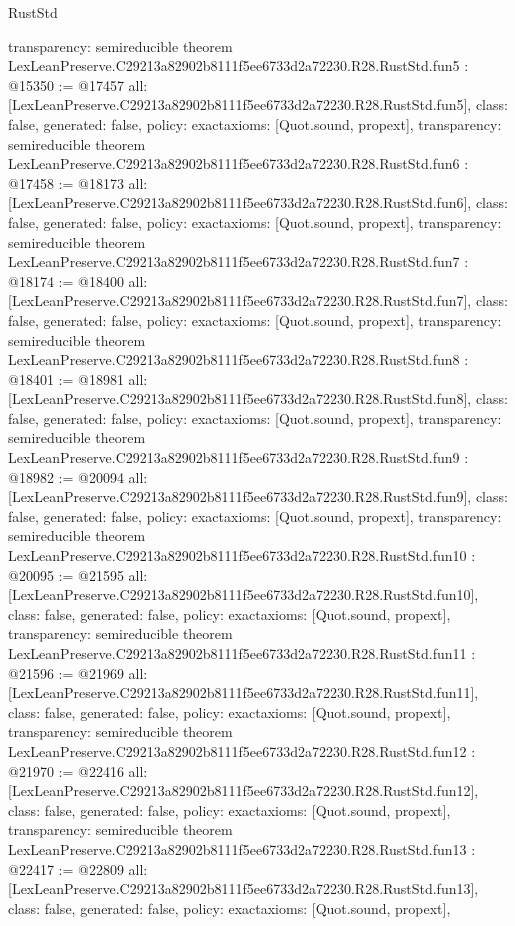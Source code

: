 \begin{lexlean}{RustStd}
\begin{coremodule}
{  transparency: semireducible
}
theorem LexLeanPreserve.C29213a82902b8111f5ee6733d2a72230.R28.RustStd.fun5 : @15350 := @17457 {
  all: [LexLeanPreserve.C29213a82902b8111f5ee6733d2a72230.R28.RustStd.fun5],
  class: false,
  generated: false,
  policy: exact{axioms: [Quot.sound, propext]},
  transparency: semireducible
}
theorem LexLeanPreserve.C29213a82902b8111f5ee6733d2a72230.R28.RustStd.fun6 : @17458 := @18173 {
  all: [LexLeanPreserve.C29213a82902b8111f5ee6733d2a72230.R28.RustStd.fun6],
  class: false,
  generated: false,
  policy: exact{axioms: [Quot.sound, propext]},
  transparency: semireducible
}
theorem LexLeanPreserve.C29213a82902b8111f5ee6733d2a72230.R28.RustStd.fun7 : @18174 := @18400 {
  all: [LexLeanPreserve.C29213a82902b8111f5ee6733d2a72230.R28.RustStd.fun7],
  class: false,
  generated: false,
  policy: exact{axioms: [Quot.sound, propext]},
  transparency: semireducible
}
theorem LexLeanPreserve.C29213a82902b8111f5ee6733d2a72230.R28.RustStd.fun8 : @18401 := @18981 {
  all: [LexLeanPreserve.C29213a82902b8111f5ee6733d2a72230.R28.RustStd.fun8],
  class: false,
  generated: false,
  policy: exact{axioms: [Quot.sound, propext]},
  transparency: semireducible
}
theorem LexLeanPreserve.C29213a82902b8111f5ee6733d2a72230.R28.RustStd.fun9 : @18982 := @20094 {
  all: [LexLeanPreserve.C29213a82902b8111f5ee6733d2a72230.R28.RustStd.fun9],
  class: false,
  generated: false,
  policy: exact{axioms: [Quot.sound, propext]},
  transparency: semireducible
}
theorem LexLeanPreserve.C29213a82902b8111f5ee6733d2a72230.R28.RustStd.fun10 : @20095 := @21595 {
  all: [LexLeanPreserve.C29213a82902b8111f5ee6733d2a72230.R28.RustStd.fun10],
  class: false,
  generated: false,
  policy: exact{axioms: [Quot.sound, propext]},
  transparency: semireducible
}
theorem LexLeanPreserve.C29213a82902b8111f5ee6733d2a72230.R28.RustStd.fun11 : @21596 := @21969 {
  all: [LexLeanPreserve.C29213a82902b8111f5ee6733d2a72230.R28.RustStd.fun11],
  class: false,
  generated: false,
  policy: exact{axioms: [Quot.sound, propext]},
  transparency: semireducible
}
theorem LexLeanPreserve.C29213a82902b8111f5ee6733d2a72230.R28.RustStd.fun12 : @21970 := @22416 {
  all: [LexLeanPreserve.C29213a82902b8111f5ee6733d2a72230.R28.RustStd.fun12],
  class: false,
  generated: false,
  policy: exact{axioms: [Quot.sound, propext]},
  transparency: semireducible
}
theorem LexLeanPreserve.C29213a82902b8111f5ee6733d2a72230.R28.RustStd.fun13 : @22417 := @22809 {
  all: [LexLeanPreserve.C29213a82902b8111f5ee6733d2a72230.R28.RustStd.fun13],
  class: false,
  generated: false,
  policy: exact{axioms: [Quot.sound, propext]},
}
\end{coremodule}
\end{lexlean}
